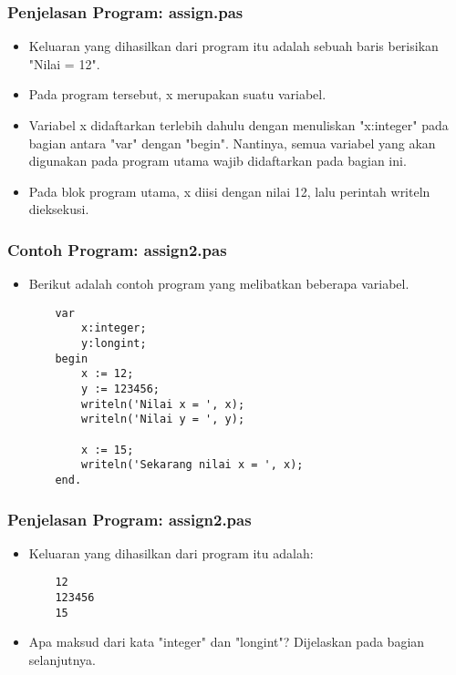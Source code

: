 \documentclass{beamer}
\begin{document}
\begin{frame}[fragile]
\frametitle{Penjelasan Program: assign.pas}
\begin{itemize}
	\item Keluaran yang dihasilkan dari program itu adalah sebuah baris berisikan "Nilai = 12".
	\item Pada program tersebut, x merupakan suatu variabel.
	\item Variabel x didaftarkan terlebih dahulu dengan menuliskan "x:integer" pada bagian antara "var" dengan "begin". Nantinya, semua variabel yang akan digunakan pada program utama wajib didaftarkan pada bagian ini.
	\item Pada blok program utama, x diisi dengan nilai 12, lalu perintah writeln dieksekusi.
\end{itemize}
\end{frame}

\begin{frame}[fragile]
\frametitle{Contoh Program: assign2.pas}
\begin{itemize}
	\item Berikut adalah contoh program yang melibatkan beberapa variabel.
	\begin{lstlisting}
	var
	    x:integer;
	    y:longint;
	begin
	    x := 12;
	    y := 123456;
	    writeln('Nilai x = ', x);
	    writeln('Nilai y = ', y);
	    
	    x := 15;
	    writeln('Sekarang nilai x = ', x);
	end.
	\end{lstlisting}
\end{itemize}
\end{frame}

\begin{frame}[fragile]
\frametitle{Penjelasan Program: assign2.pas}
\begin{itemize}
	\item Keluaran yang dihasilkan dari program itu adalah:
	\begin{lstlisting}
	12
	123456
	15
	\end{lstlisting}
	\item Apa maksud dari kata "integer" dan "longint"? Dijelaskan pada bagian selanjutnya.
\end{itemize}
\end{frame}
\end{document}
